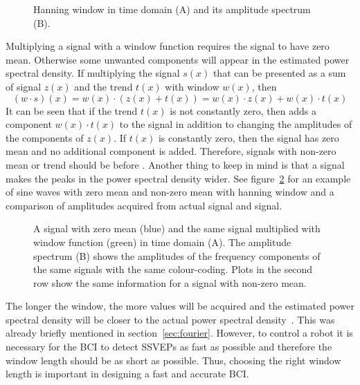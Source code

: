 \begin{figure}[h!]
	
	\caption{Hanning window in time domain (A) and its amplitude spectrum (B).}
	\label{fig:hanning_window}
\end{figure}

Multiplying a signal with a \gls{window} function requires the signal to have zero mean. Otherwise some unwanted components will appear in the estimated \gls{power spectral density}. If multiplying the signal $s(x)$ that can be presented as a sum of  signal $z(x)$ and the trend $t(x)$ with \gls{window} $w(x)$, then
\begin{equation}
	(w\cdot s)(x) = w(x)\cdot(z(x)+t(x))=w(x)\cdot z(x)+w(x)\cdot t(x)
\end{equation}
It can be seen that if the \gls{trend} $t(x)$ is not constantly zero, then  adds a component $w(x)\cdot t(x)$ to the signal in addition to changing the amplitudes of the components of $z(x)$. If $t(x)$ is constantly zero, then the signal has zero \gls{mean} and no additional component is added. Therefore, signals with non-zero \gls{mean} or \gls{trend} should be  before . Another thing to keep in mind is that  a signal makes the peaks in the \gls{power spectral density} wider. See figure~\ref{fig:window} for an example of sine waves with zero \gls{mean} and non-zero \gls{mean}  with hanning \gls{window} and a comparison of amplitudes acquired from actual signal and  signal.

\begin{figure}[h!]
	
	\caption{A signal with zero mean (blue) and the same signal multiplied with window function (green) in time domain (A). The amplitude spectrum (B) shows the amplitudes of the frequency components of the same signals with the same colour-coding. Plots in the second row show the same information for a signal with non-zero mean.}
	\label{fig:window}
\end{figure}

The longer the window, the more values will be acquired and the estimated \gls{power spectral density} will be closer to the actual \gls{power spectral density}~\cite{psd}. This was already briefly mentioned in section~\ref{sec:fourier}. However, to control a robot it is necessary for the \gls{BCI} to detect \glspl{SSVEP} as fast as possible and therefore the \gls{window} length should be as short as possible. Thus, choosing the right \gls{window} length is important in designing a fast and accurate \gls{BCI}.

